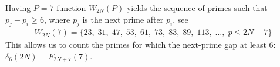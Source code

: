 Having $P=7$ function $W_{2N}(P)$ yields the sequence of primes such that $p_j-p_i \geq 6$,
where $p_j$ is the next prime after $p_i$, see~\cite{oeis:A124582}
\begin{align*}
    W_{2N}(7) = \{ 23, \; 31, \;  47, \; 53, \; 61, \;  73, \; 83, \; 89, \; 113, \; \dots, \; p \leq 2N-7 \}
\end{align*}
This allows us to count the primes for which the next-prime gap at least 6: $\delta_6(2N) = F_{2N+7}(7)$.
